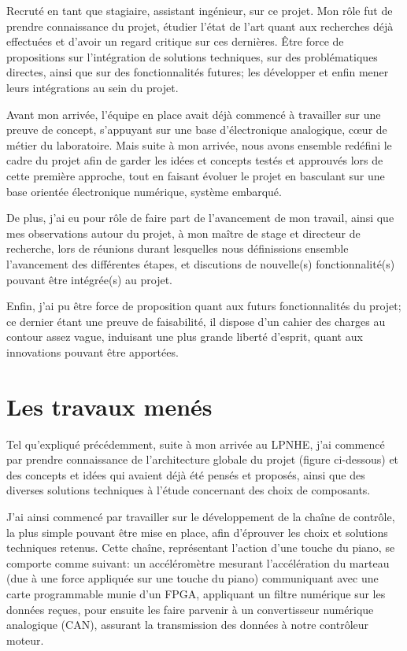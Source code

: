 \documentclass[french,a4paper,12pt]{report}
\begin{document}
	Recruté en tant que stagiaire, assistant ingénieur, sur ce projet. Mon rôle fut de prendre connaissance du projet, étudier l'état de l'art quant aux recherches déjà effectuées et d'avoir un regard critique sur ces dernières. Être force de propositions sur l'intégration de solutions techniques, sur des problématiques directes, ainsi que sur des fonctionnalités futures; les développer et enfin mener leurs intégrations au sein du projet.
	
	Avant mon arrivée, l'équipe en place avait déjà commencé à travailler sur une preuve de concept, s'appuyant sur une base d'électronique analogique, cœur de métier du laboratoire. Mais suite à mon arrivée, nous avons ensemble redéfini le cadre du projet afin de garder les idées et concepts testés et approuvés lors de cette première approche, tout en faisant évoluer le projet en basculant sur une base orientée électronique numérique, système embarqué.
	
	De plus, j'ai eu pour rôle de faire part de l'avancement de mon travail, ainsi que mes observations autour du projet, à mon maître de stage et directeur de recherche, lors de réunions durant lesquelles nous définissions ensemble l'avancement des différentes étapes, et discutions de nouvelle(s) fonctionnalité(s) pouvant être intégrée(s) au projet.
	
	Enfin, j'ai pu être force de proposition quant aux futurs fonctionnalités du projet; ce dernier étant une preuve de faisabilité, il dispose d'un cahier des charges au contour assez vague, induisant une plus grande liberté d'esprit, quant aux innovations pouvant être apportées.	
	
	
	\chapter{Les travaux menés}
	
	Tel qu'expliqué précédemment, suite à mon arrivée au LPNHE, j'ai commencé par prendre connaissance de l'architecture globale du projet (figure ci-dessous) et des concepts et idées qui avaient déjà été pensés et proposés, ainsi que des diverses solutions techniques à l'étude concernant des choix de composants.
	
	J'ai ainsi commencé par travailler sur le développement de la chaîne de contrôle, la plus simple pouvant être mise en place, afin d'éprouver les choix et solutions techniques retenus.
	Cette chaîne, représentant l'action d'une touche du piano, se comporte comme suivant: un accéléromètre mesurant l'accélération du marteau (due à une force appliquée sur une touche du piano) communiquant avec une carte programmable munie d'un FPGA, appliquant un filtre numérique sur les données reçues, pour ensuite les faire parvenir à un convertisseur numérique analogique (CAN), assurant la transmission des données à notre contrôleur moteur.\newline
	
\end{document}
